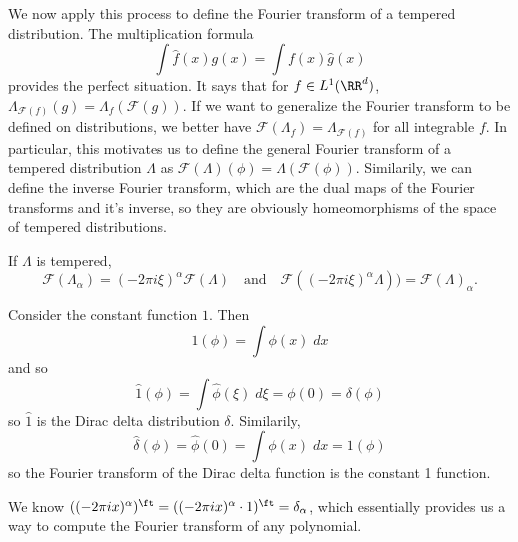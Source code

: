 We now apply this process to define the Fourier transform of a tempered distribution. The multiplication formula
%
\[ \int \widehat{f}(x) g(x) = \int f(x) \widehat{g}(x) \]
%
provides the perfect situation. It says that for $f \in L^1(\RR^d)$, $\Lambda_{\mathcal{F}(f)}(g) = \Lambda_f(\mathcal{F}(g))$. If we want to generalize the Fourier transform to be defined on distributions, we better have $\mathcal{F}(\Lambda_f) = \Lambda_{\mathcal{F}(f)}$ for all integrable $f$. In particular, this motivates us to define the general Fourier transform of a tempered distribution $\Lambda$ as $\mathcal{F}(\Lambda)(\phi) = \Lambda \left( \mathcal{F}(\phi) \right)$. Similarily, we can define the inverse Fourier transform, which are the dual maps of the Fourier transforms and it's inverse, so they are obviously homeomorphisms of the space of tempered distributions.

\begin{theorem}
	If $\Lambda$ is tempered,
	\[ \mathcal{F}(\Lambda_\alpha) = (-2 \pi i \xi)^\alpha \mathcal{F}(\Lambda)\quad\text{and}\quad \mathcal{F}((-2\pi i \xi)^\alpha \Lambda)) = \mathcal{F}(\Lambda)_\alpha. \]
\end{theorem}

\begin{example}
	Consider the constant function $1$. Then
	\[ 1(\phi) = \int \phi(x)\; dx \]
	and so
	\[ \widehat{1}(\phi) = \int \widehat{\phi}(\xi)\; d\xi = \phi(0) = \delta(\phi) \]
	so $\widehat{1}$ is the Dirac delta distribution $\delta$. Similarily,
	\[ \widehat{\delta}(\phi) = \widehat{\phi}(0) = \int \phi(x)\; dx = 1(\phi) \]
	so the Fourier transform of the Dirac delta function is the constant 1 function.
\end{example}

\begin{example}
	We know $((-2 \pi i x)^\alpha)^\ft = ((- 2 \pi i x)^\alpha \cdot 1)^\ft = \delta_\alpha$, which essentially provides us a way to compute the Fourier transform of any polynomial.
\end{example}

